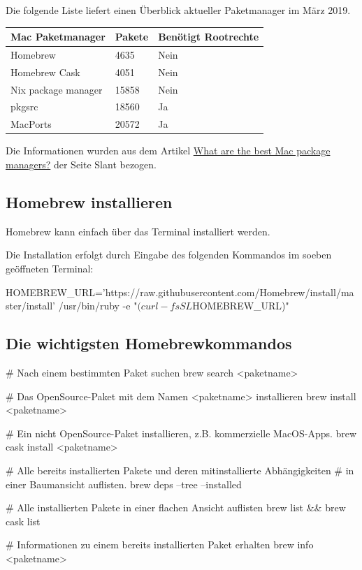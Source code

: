 \documentclass[]{article}
\begin{document}
Die folgende Liste liefert einen Überblick aktueller Paketmanager im März 2019.

\begin{tabular}[t]{lll}
	\toprule
	Mac Paketmanager & Pakete & Benötigt Rootrechte \\
	\midrule
	Homebrew & 4635 & Nein \\
	Homebrew Cask & 4051 & Nein \\
	Nix package manager & 15858 & Nein \\
	pkgsrc & 18560 & Ja \\
	MacPorts & 20572 & Ja \\
	\bottomrule
\end{tabular}

Die Informationen wurden aus dem Artikel \href{https://www.slant.co/topics/511/~best-mac-package-managers#3}{What are the best Mac package managers?} der Seite Slant bezogen.

\subsection{Homebrew installieren}
Homebrew kann einfach über das Terminal installiert werden.

Die Installation erfolgt durch Eingabe des folgenden Kommandos im soeben geöffneten Terminal:
\begin{bashcode}
HOMEBREW_URL='https://raw.githubusercontent.com/Homebrew/install/master/install'
/usr/bin/ruby -e "$(curl -fsSL $HOMEBREW_URL)"
\end{bashcode}

\subsection{Die wichtigsten Homebrewkommandos}
\begin{bashcode}
# Nach einem bestimmten Paket suchen
brew search <paketname> 

# Das OpenSource-Paket mit dem Namen <paketname> installieren
brew install <paketname>

# Ein nicht OpenSource-Paket installieren,  z.B. kommerzielle MacOS-Apps.
brew cask install <paketname>  

# Alle bereits installierten Pakete und deren mitinstallierte Abhängigkeiten 
# in einer Baumansicht auflisten.
brew deps --tree --installed

# Alle installierten Pakete in einer flachen Ansicht auflisten
brew list && brew cask list

# Informationen zu einem bereits installierten Paket erhalten
brew info <paketname> 
\end{bashcode}
\end{document}
